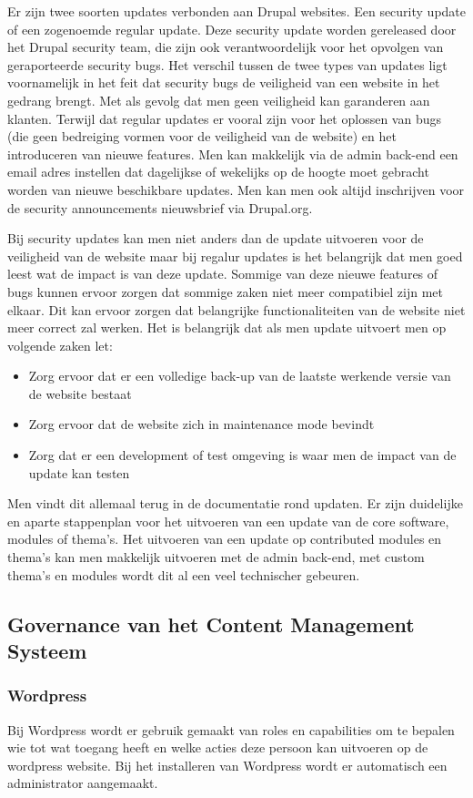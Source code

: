 Er zijn twee soorten updates verbonden aan Drupal websites. Een security update of een zogenoemde regular update. Deze security update worden gereleased door het Drupal security team, die zijn ook verantwoordelijk voor het opvolgen van geraporteerde security bugs. Het verschil tussen de twee types van updates ligt voornamelijk in het feit dat security bugs de veiligheid van een website in het gedrang brengt. Met als gevolg dat men geen veiligheid kan garanderen aan klanten. Terwijl dat regular updates er vooral zijn voor het oplossen van bugs (die geen bedreiging vormen voor de veiligheid van de website) en het introduceren van nieuwe features. Men kan makkelijk via de admin back-end een email adres instellen dat dagelijkse of wekelijks op de hoogte moet gebracht worden van nieuwe beschikbare updates. Men kan men ook altijd inschrijven voor de security announcements nieuwsbrief via Drupal.org.  

Bij security updates kan men niet anders dan de update uitvoeren voor de veiligheid van de website maar bij regalur updates is het belangrijk dat men goed leest wat de impact is van deze update. Sommige van deze nieuwe features of bugs kunnen ervoor zorgen dat sommige zaken niet meer compatibiel zijn met elkaar. Dit kan ervoor zorgen dat belangrijke functionaliteiten van de website niet meer correct zal werken. Het is belangrijk dat als men update uitvoert men op volgende zaken let:
\begin{itemize}
	\item Zorg ervoor dat er een volledige back-up van de laatste werkende versie van de website bestaat
	\item Zorg ervoor dat de website zich in maintenance mode bevindt
	\item Zorg dat er een development of test omgeving is waar men de impact van de update kan testen
\end{itemize}
Men vindt dit allemaal terug in de documentatie rond updaten. Er zijn duidelijke en aparte stappenplan voor het uitvoeren van een update van de core software, modules of thema's. Het uitvoeren van een update op contributed modules en thema's kan men makkelijk uitvoeren met de admin back-end, met custom thema's en modules wordt dit al een veel technischer gebeuren. 
\subsection{Governance van het Content Management Systeem}
\subsubsection{Wordpress}
Bij Wordpress wordt er gebruik gemaakt van roles en capabilities om te bepalen wie tot wat toegang heeft en welke acties deze persoon kan uitvoeren op de wordpress website. Bij het installeren van Wordpress wordt er automatisch een administrator aangemaakt. 

